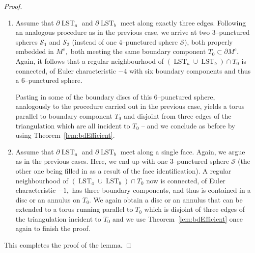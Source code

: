 \documentclass[a4paper]{gtart}
\def\lst{\operatorname{LST}}
\def\tri{\mathcal{T}}
\def\manifold{M}
\def\core{M^c}
\theoremstyle{plain}
\theoremstyle{definition}
\theoremstyle{remark}
\numberwithin{equation}{section}
\begin{document}
\begin{proof}
\begin{enumerate}
Hence suppose $(\lst_a \cup \lst_b) \cap T_0$ is contained in an annulus on $T_0$ and hence two of its boundary components bound discs in the complement of the intersection. Pasting these two discs of $T_0$ into $\mathcal{S}$ and pushing them slightly off $T_0$ yields an annulus properly embedded in $\core$ and disjoint from the two edges of $\tri$ of the common spine (which are both incident to $T_0$). This annulus together with the annulus in $T_0$ complementary to $(\lst_a \cup \lst_b) \cap T_0$ extends to a boundary parallel torus since otherwise $\manifold$ would contain a non-trivial Seifert fibred space.
Again, this boundary parallel torus leads to a contradiction to the assumption that $\tri$ is boundary efficient (cf. Theorem~\ref{lem:bdEfficient}). 

    \item Assume that $\partial \lst_a$ and $\partial \lst_b$ meet along exactly three edges. Following an analogous procedure as in the previous case, we arrive at two 3--punctured spheres $\mathcal{S}_1$ and $\mathcal{S}_2$ (instead of one 4--punctured sphere $\mathcal{S}$), both properly embedded in $\core,$ both meeting the same boundary component $T_0 \subset \partial \core.$ Again, it follows that a regular neighbourhood of $(\lst_a \cup \lst_b) \cap T_0$ is connected, of Euler characteristic $-4$ with six boundary components and thus a $6$--punctured sphere. 

Pasting in some of the boundary discs of this $6$--punctured sphere, analogously to the procedure carried out in the previous case, yields a torus parallel to boundary component $T_0$ and disjoint from three edges of the triangulation which are all incident to $T_0$ -- and we conclude as before by using Theorem~\ref{lem:bdEfficient}.  

\item Assume that $\partial \lst_a$ and $\partial \lst_b$ meet along a single face. Again, we argue as in the previous cases. Here, we end up with one 3--punctured sphere $\mathcal{S}$ (the other one being filled in as a result of the face identification). A regular neighbourhood of $(\lst_a \cup \lst_b) \cap T_0$ now is connected, of Euler characteristic $-1,$ has three boundary components, and thus is contained in a disc or an annulus on $T_0.$  We again obtain a disc or an annulus that can be extended to a torus running parallel to $T_0$ which is disjoint of three edges of the triangulation incident to $T_0$ and we use Theorem~\ref{lem:bdEfficient} once again to finish the proof. 
\end{enumerate}
This completes the proof of the lemma.
\end{proof}
\end{document}
